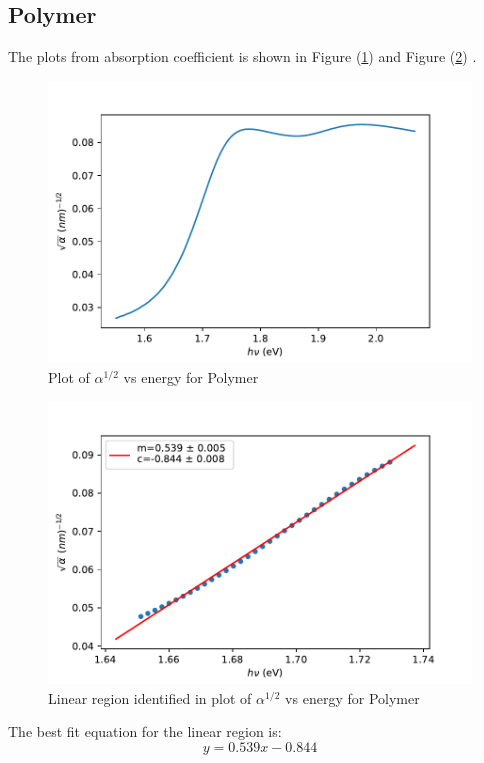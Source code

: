 \documentclass[a4paper, amsfonts, amssymb, amsmath, reprint, showkeys, nofootinbib, twoside]{revtex4-1}
\begin{document}
\subsection{Polymer}
The plots from absorption coefficient is shown in Figure (\ref{9}) and Figure (\ref{10}) .
\begin{figure}[H]
	\centering
	\includegraphics[scale=0.6]{pol}
	\caption{Plot of $\alpha^{1/2}$ vs energy for Polymer}
	\label{9}
\end{figure}

\begin{figure}[H]
	\centering
	\includegraphics[scale=0.6]{polf}
	\caption{Linear region identified in plot of $\alpha^{1/2}$ vs energy for Polymer}
	\label{10}
\end{figure}

The best fit equation for the linear region is:
\begin{equation}
	y=0.539 x - 0.844
\end{equation}
\end{document}
